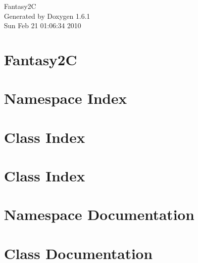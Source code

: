 \documentclass[a4paper]{book}
\begin{document}
\hypersetup{pageanchor=false}
\begin{titlepage}
\vspace*{7cm}
\begin{center}
{\Large Fantasy2C }\\
\vspace*{1cm}
{\large Generated by Doxygen 1.6.1}\\
\vspace*{0.5cm}
{\small Sun Feb 21 01:06:34 2010}\\
\end{center}
\end{titlepage}
\clearemptydoublepage
{}
\tableofcontents
\clearemptydoublepage
{}
\hypersetup{pageanchor=true}
\chapter{Fantasy2C}
\label{index}\hypertarget{index}{}
\chapter{Namespace Index}

\chapter{Class Index}

\chapter{Class Index}

\chapter{Namespace Documentation}







\chapter{Class Documentation}

















\printindex
\end{document}

